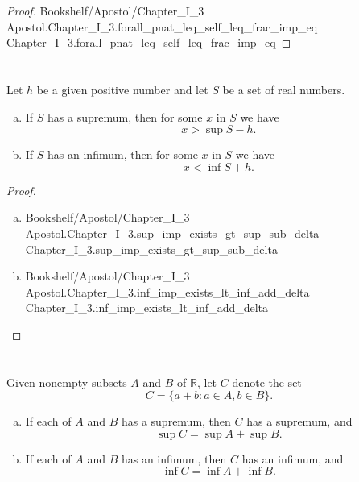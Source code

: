 \documentclass{article}
\newcommand{\link}[1]{\lean{../..}
  {Bookshelf/Apostol/Chapter\_I\_3}
  {Apostol.Chapter\_I\_3.#1}
  {Chapter\_I\_3.#1}
}
\begin{document}
\begin{proof}

  \link{forall\_pnat\_leq\_self\_leq\_frac\_imp\_eq}

\end{proof}

\section*{}%
%

Let $h$ be a given positive number and let $S$ be a set of real numbers.
\begin{enumerate}[(a)]
  \item If $S$ has a supremum, then for some $x$ in $S$ we have
    $$x > \sup{S} - h.$$
  \item If $S$ has an infimum, then for some $x$ in $S$ we have
    $$x < \inf{S} + h.$$
\end{enumerate}

\begin{proof}

  \  %

  \begin{enumerate}[(a)]
    \item \link{sup\_imp\_exists\_gt\_sup\_sub\_delta}
    \item \link{inf\_imp\_exists\_lt\_inf\_add\_delta}
  \end{enumerate}

\end{proof}

\section*{}%
%

Given nonempty subsets $A$ and $B$ of $\mathbb{R}$, let $C$ denote the set
$$C = \{a + b : a \in A, b \in B\}.$$

\begin{enumerate}[(a)]
  \item If each of $A$ and $B$ has a supremum, then $C$ has a supremum, and
    $$\sup{C} = \sup{A} + \sup{B}.$$
  \item If each of $A$ and $B$ has an infimum, then $C$ has an infimum, and
    $$\inf{C} = \inf{A} + \inf{B}.$$
\end{enumerate}

\end{document}
